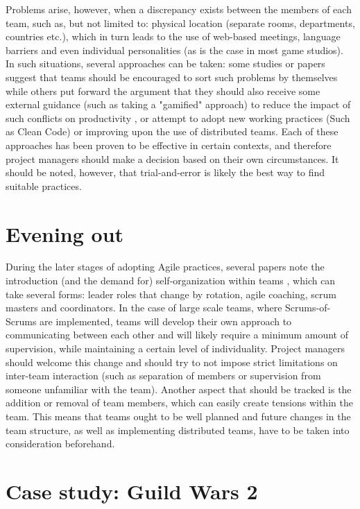 \documentclass{scrartcl}
\begin{document}
    
    
    Problems arise, however, when a discrepancy exists between the members of each team, such as, but not limited to: physical location (separate rooms, departments, countries etc.), which in turn leads to the use of web-based meetings, language barriers and even individual personalities (as is the case in most game studios). In such situations, several approaches can be taken: some studies or papers suggest that teams should be encouraged to sort such problems by themselves \cite{4599458, 4599456, 4293601} while others put forward the argument that they should also receive some external guidance (such as taking a "gamified" approach) to reduce the impact of such conflicts on productivity \cite{7883385, 6475422}, or attempt to adopt new working practices (Such as Clean Code\cite{cleancode}) or improving upon the use of distributed teams. Each of these approaches has been proven to be effective in certain contexts, and therefore project managers should make a decision based on their own circumstances. It should be noted, however, that trial-and-error is likely the best way to find suitable practices.
    
    \section{Evening out}
    
    During the later stages of adopting Agile practices, several papers note the introduction (and the demand for) self-organization within teams \cite{4599458, 4599456, 6986022, 8064437, 6475422}, which can take several forms: leader roles that change by rotation, agile coaching, scrum masters and coordinators. In the case of large scale teams, where Scrums-of-Scrums are implemented, teams will develop their own approach to communicating between each other and will likely require a minimum amount of supervision, while maintaining a certain level of individuality. Project managers should welcome this change and should try to not impose strict limitations on inter-team interaction (such as separation of members or supervision from someone unfamiliar with the team). Another aspect that should be tracked is the addition or removal of team members, which can easily create tensions within the team. This means that teams ought to be well planned and future changes in the team structure, as well as implementing distributed teams, have to be taken into consideration beforehand.
    
    \section{Case study: Guild Wars 2}
    
\end{document}
